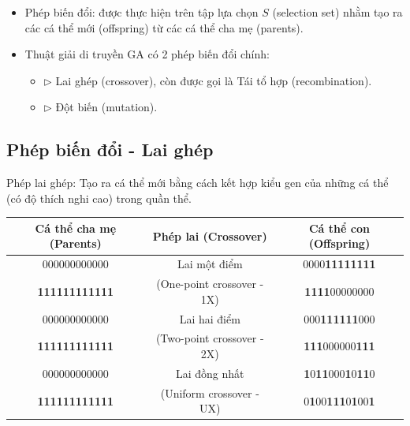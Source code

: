 \documentclass{book}
\begin{document}
\begin{itemize}
    \item Phép biến đổi: được thực hiện trên tập lựa chọn $S$ (selection set) nhằm tạo ra các cá thể mới (offspring) từ các cá thể cha mẹ (parents).
    \item Thuật giải di truyền GA có 2 phép biến đổi chính:
    \begin{itemize}
        \item[] $\triangleright$ Lai ghép (crossover), còn được gọi là Tái tổ hợp (recombination).
        \item[] $\triangleright$ Đột biến (mutation).
    \end{itemize}
\end{itemize}

\subsection{Phép biến đổi - Lai ghép}

Phép lai ghép: Tạo ra cá thể mới bằng cách kết hợp kiểu gen của những cá thể (có độ thích nghi cao) trong quần thể.

\begin{table}[h!]
    \centering
    \begin{tabular}{|c|c|c|} %
        \hline
        \textbf{Cá thể cha mẹ (Parents)} & \textbf{Phép lai (Crossover)} & \textbf{Cá thể con (Offspring)} \\
        \hline
        000000000000 & Lai một điểm & 0000\textbf{11111111} \\
        \textbf{111111111111} & (One-point crossover - 1X) & \textbf{1111}00000000 \\
        \hline
        000000000000 & Lai hai điểm & 000\textbf{111111}000 \\
        \textbf{111111111111} & (Two-point crossover - 2X) & \textbf{111}000000\textbf{111} \\
        \hline
        000000000000 & Lai đồng nhất & \textbf{1}0\textbf{11}000\textbf{1}0\textbf{11}0 \\
        \textbf{111111111111} & (Uniform crossover - UX) & 0\textbf{1}00\textbf{111}0\textbf{1}00\textbf{1} \\
        \hline
    \end{tabular}
    \label{tab:crossover_types}
\end{table}
\end{document}
